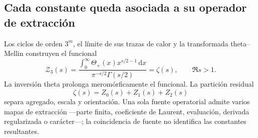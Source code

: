 \subsection{Cada constante queda asociada a su operador de extracci\'on}

Los ciclos de orden \(3^m\), el l\'imite de sus trazas de calor y la
transformada theta--Mellin construyen el funcional
\begin{equation}
 \mathcal Z_3(s)
 =\frac{\displaystyle
 \int_0^\infty\Theta_+(x)x^{s/2-1}\,\mathrm dx}
 {\pi^{-s/2}\Gamma(s/2)}
 =\zeta(s),
 \qquad \Re s>1.
 \label{p3-83-c44-s1:eq:funcional-triadico-resumen-rev11}
\end{equation}
La inversi\'on theta prolonga merom\'orficamente el funcional. La partici\'on
residual
\[
 \zeta(s)=Z_0(s)+Z_1(s)+Z_2(s)
\]
separa agregado, escala y orientaci\'on. Una sola fuente operatorial admite
varios mapas de extracci\'on ---parte finita, coeficiente de Laurent,
evaluaci\'on, derivada regularizada o car\'acter---; la coincidencia de fuente
no identifica las constantes resultantes.

\par

